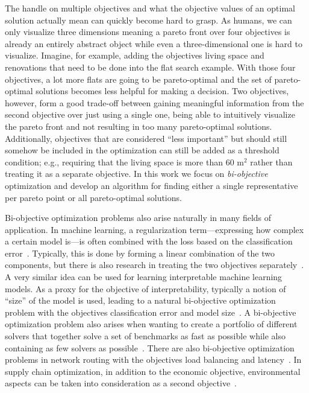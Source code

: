
The handle on multiple objectives and what the objective values of an optimal solution actually mean can quickly become hard to grasp.
As humans, we can only visualize three dimensions meaning a pareto front over four objectives is already an entirely abstract object while even a three-dimensional one is hard to visualize.
Imagine, for example, adding the objectives living space and renovations that need to be done into the flat search example.
With those four objectives, a lot more flats are going to be pareto-optimal and the set of pareto-optimal solutions becomes less helpful for making a decision.
Two objectives, however, form a good trade-off between gaining meaningful information from the second objective over just using a single one, being able to intuitively visualize the pareto front and not resulting in too many pareto-optimal solutions.
Additionally, objectives that are considered ``less important'' but should still somehow be included in the optimization can still be added as a threshold condition;
e.g., requiring that the living space is more than 60 $\text{m}^2$ rather than treating it as a separate objective.
In this work we focus on \emph{bi-objective} optimization and develop an algorithm for finding either a single representative per pareto point or all pareto-optimal solutions.

Bi-objective optimization problems also arise naturally in many fields of application.
In machine learning, a regularization term---expressing how complex a certain model is---is often combined with the loss based on the classification error~\autocite{}.
Typically, this is done by forming a linear combination of the two components, but there is also research in treating the two objectives separately~\autocite{DBLP:journals/tsmc/JinS08}.
A very similar idea can be used for learning interpretable machine learning models.
As a proxy for the objective of interpretability, typically a notion of ``size'' of the model is used, leading to a natural bi-objective optimization problem with the objectives classification error and model size~\autocite{DBLP:conf/ijcai/Ignatiev0NS21,DBLP:conf/cp/MaliotovM18,DBLP:conf/ijcai/NarodytskaIPM18,DBLP:conf/ijcai/Hu0HH20,DBLP:conf/cp/YuISB20,DBLP:conf/aaai/Ignatiev0S021}.
A bi-objective optimization problem also arises when wanting to create a portfolio of different solvers that together solve a set of benchmarks as fast as possible while also containing as few solvers as possible~\autocite{DBLP:conf/cp/JanotaMSM21}.
There are also bi-objective optimization problems in network routing with the objectives load balancing and latency~\autocite{SilverioEtAl2022biobjectiveoptimization}.
In supply chain optimization, in addition to the economic objective, environmental aspects can be taken into consideration as a second objective~\autocite{DBLP:journals/cce/Pinto-VarelaBN11}.

